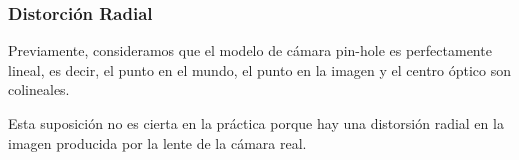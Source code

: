 \begin{frame}
    \frametitle{Distorción Radial}
    
    \footnotesize
    
    Previamente, consideramos que el modelo de cámara pin-hole es perfectamente lineal, es decir, el punto en el mundo, el punto en la imagen y el centro óptico son colineales.
    
    Esta suposición no es cierta en la práctica porque hay una distorsión radial en la imagen producida por la lente de la cámara real.
    
    \begin{figure}[!h]
        \centering
    \end{figure}
    
\end{frame}

